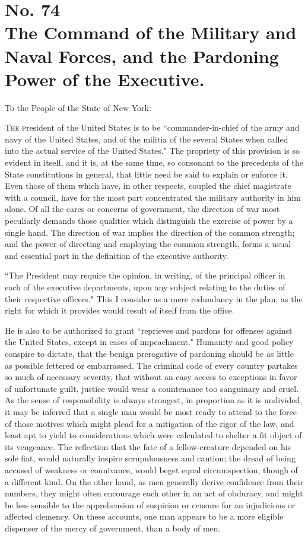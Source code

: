 \chapter[No. 74: The Command of the Military and Naval Forces, and the Pardoning Power of the Executive.]{No. 74\\ {\small The Command of the Military and Naval Forces, and the Pardoning Power of the Executive.}}
To the People of the State of New York:
\vspace{.25cm}

\textsc{The p}resident of the United States is to be ``commander-in-chief of the army and navy of the United States, and of the militia of the several States when called into the actual service of the United States." The propriety of this provision is so evident in itself, and it is, at the same time, so consonant to the precedents of the State constitutions in general, that little need be said to explain or enforce it. Even those of them which have, in other respects, coupled the chief magistrate with a council, have for the most part concentrated the military authority in him alone. Of all the cares or concerns of government, the direction of war most peculiarly demands those qualities which distinguish the exercise of power by a single hand. The direction of war implies the direction of the common strength; and the power of directing and employing the common strength, forms a usual and essential part in the definition of the executive authority.

``The President may require the opinion, in writing, of the principal officer in each of the executive departments, upon any subject relating to the duties of their respective officers." This I consider as a mere redundancy in the plan, as the right for which it provides would result of itself from the office.

He is also to be authorized to grant ``reprieves and pardons for offenses against the United States, except in cases of impeachment." Humanity and good policy conspire to dictate, that the benign prerogative of pardoning should be as little as possible fettered or embarrassed. The criminal code of every country partakes so much of necessary severity, that without an easy access to exceptions in favor of unfortunate guilt, justice would wear a countenance too sanguinary and cruel. As the sense of responsibility is always strongest, in proportion as it is undivided, it may be inferred that a single man would be most ready to attend to the force of those motives which might plead for a mitigation of the rigor of the law, and least apt to yield to considerations which were calculated to shelter a fit object of its vengeance. The reflection that the fate of a fellow-creature depended on his sole fiat, would naturally inspire scrupulousness and caution; the dread of being accused of weakness or connivance, would beget equal circumspection, though of a different kind. On the other hand, as men generally derive confidence from their numbers, they might often encourage each other in an act of obduracy, and might be less sensible to the apprehension of suspicion or censure for an injudicious or affected clemency. On these accounts, one man appears to be a more eligible dispenser of the mercy of government, than a body of men.

